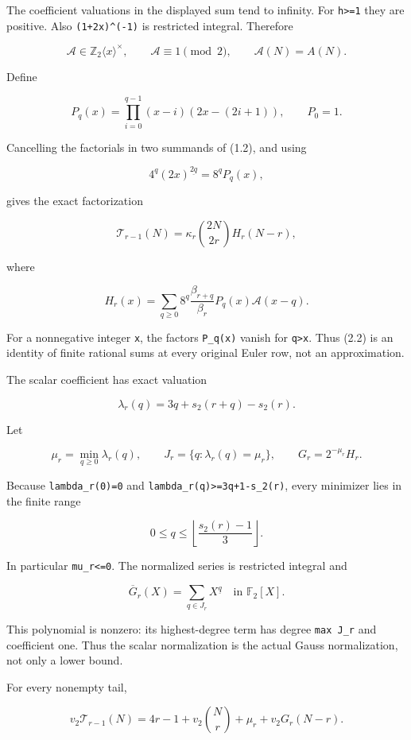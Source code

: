 \documentclass[11pt,letterpaper]{article}
\begin{document}
The coefficient valuations in the displayed sum tend to infinity. For \texttt{h\textgreater{}=1} they are positive. Also \texttt{(1+2x)\^{}(-1)} is restricted integral. Therefore

\[
\mathscr A\in\mathbb Z_2\langle x\rangle^\times,
\qquad \mathscr A\equiv1\pmod2,
\qquad \mathscr A(N)=A(N).
\]

Define

\[
P_q(x)=\prod_{i=0}^{q-1}(x-i)(2x-(2i+1)),\qquad P_0=1.
\]

Cancelling the factorials in two summands of (1.2), and using

\[
4^q(2x)^{\underline{2q}}=8^qP_q(x),
\]

gives the exact factorization

\[
\mathcal T_{r-1}(N)
=\kappa_r\binom{2N}{2r}H_r(N-r), \tag{2.2}
\]

where

\[
H_r(x)=\sum_{q\ge0}8^q\frac{\beta_{r+q}}{\beta_r}P_q(x)\mathscr A(x-q).
\]

For a nonnegative integer \texttt{x}, the factors \texttt{P\_q(x)} vanish for \texttt{q\textgreater{}x}. Thus (2.2) is an identity of finite rational sums at every original Euler row, not an approximation.

The scalar coefficient has exact valuation

\[
\lambda_r(q)=3q+s_2(r+q)-s_2(r). \tag{2.3}
\]

Let

\[
\mu_r=\min_{q\ge0}\lambda_r(q),\qquad
J_r=\{q:\lambda_r(q)=\mu_r\},\qquad G_r=2^{-\mu_r}H_r.
\]

Because \texttt{lambda\_r(0)=0} and \texttt{lambda\_r(q)\textgreater{}=3q+1-s\_2(r)}, every minimizer lies in the finite range

\[
0\le q\le\left\lfloor\frac{s_2(r)-1}{3}\right\rfloor. \tag{2.4}
\]

In particular \texttt{mu\_r\textless{}=0}. The normalized series is restricted integral and

\[
\overline G_r(X)=\sum_{q\in J_r}X^{\underline q}\quad\text{in }\mathbb F_2[X]. \tag{2.5}
\]

This polynomial is nonzero: its highest-degree term has degree \texttt{max\ J\_r} and coefficient one. Thus the scalar normalization is the actual Gauss normalization, not only a lower bound.

For every nonempty tail,

\[
\boxed{v_2\mathcal T_{r-1}(N)
=4r-1+v_2\binom Nr+\mu_r+v_2G_r(N-r).} \tag{2.6}
\]
\end{document}
